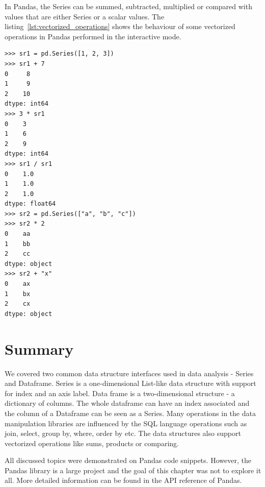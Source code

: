 In Pandas, the Series can be summed, subtracted, multiplied or compared with values that are either Series or a scalar
values.
The listing~\ref{lst:vectorized_operations} shows the behaviour of some vectorized operations in Pandas performed in
the interactive mode.

\begin{lstlisting}[caption=Vectorized operations, label={lst:vectorized_operations}, captionpos=b]
>>> sr1 = pd.Series([1, 2, 3])
>>> sr1 + 7
0     8
1     9
2    10
dtype: int64
>>> 3 * sr1
0    3
1    6
2    9
dtype: int64
>>> sr1 / sr1
0    1.0
1    1.0
2    1.0
dtype: float64
>>> sr2 = pd.Series(["a", "b", "c"])
>>> sr2 * 2
0    aa
1    bb
2    cc
dtype: object
>>> sr2 + "x"
0    ax
1    bx
2    cx
dtype: object
\end{lstlisting}

\section*{Summary} %

We covered two common data structure interfaces used in data analysis - Series and Dataframe.
Series is a one-dimensional List-like data structure with support for index and an axis label.
Data frame is a two-dimensional structure - a dictionary of columns.
The whole dataframe can have an index associated and the column of a Dataframe can be seen as a Series.
Many operations in the data manipulation libraries are influenced by the SQL language operations such as join, select,
group by, where, order by etc.
The data structures also support vectorized operations like sums, products or comparing.

All discussed topics were demonstrated on Pandas code snippets.
However, the Pandas library is a large project and the goal of this chapter was not to explore it all.
More detailed information can be found in the API reference of Pandas\cite{pandas_docs}.
